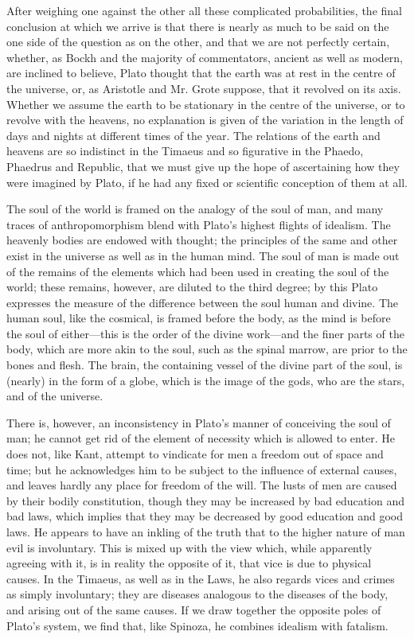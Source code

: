 After weighing one against the other all these complicated probabilities,
the final conclusion at which we arrive is that there is nearly as much to
be said on the one side of the question as on the other, and that we are
not perfectly certain, whether, as Bockh and the majority of commentators,
ancient as well as modern, are inclined to believe, Plato thought that the
earth was at rest in the centre of the universe, or, as Aristotle and Mr.
Grote suppose, that it revolved on its axis. Whether we assume the earth
to be stationary in the centre of the universe, or to revolve with the
heavens, no explanation is given of the variation in the length of days
and nights at different times of the year. The relations of the earth and
heavens are so indistinct in the Timaeus and so figurative in the Phaedo,
Phaedrus and Republic, that we must give up the hope of ascertaining how
they were imagined by Plato, if he had any fixed or scientific conception
of them at all.


The soul of the world is framed on the analogy of the soul of man, and
many traces of anthropomorphism blend with Plato’s highest flights of
idealism. The heavenly bodies are endowed with thought; the principles of
the same and other exist in the universe as well as in the human mind. The
soul of man is made out of the remains of the elements which had been used
in creating the soul of the world; these remains, however, are diluted to
the third degree; by this Plato expresses the measure of the difference
between the soul human and divine. The human soul, like the cosmical, is
framed before the body, as the mind is before the soul of either—this
is the order of the divine work—and the finer parts of the body,
which are more akin to the soul, such as the spinal marrow, are prior to
the bones and flesh. The brain, the containing vessel of the divine part
of the soul, is (nearly) in the form of a globe, which is the image of the
gods, who are the stars, and of the universe.

There is, however, an inconsistency in Plato’s manner of conceiving the
soul of man; he cannot get rid of the element of necessity which is
allowed to enter. He does not, like Kant, attempt to vindicate for men a
freedom out of space and time; but he acknowledges him to be subject to
the influence of external causes, and leaves hardly any place for freedom
of the will. The lusts of men are caused by their bodily constitution,
though they may be increased by bad education and bad laws, which implies
that they may be decreased by good education and good laws. He appears to
have an inkling of the truth that to the higher nature of man evil is
involuntary. This is mixed up with the view which, while apparently
agreeing with it, is in reality the opposite of it, that vice is due to
physical causes. In the Timaeus, as well as in the Laws, he also regards
vices and crimes as simply involuntary; they are diseases analogous to the
diseases of the body, and arising out of the same causes. If we draw
together the opposite poles of Plato’s system, we find that, like Spinoza,
he combines idealism with fatalism.

